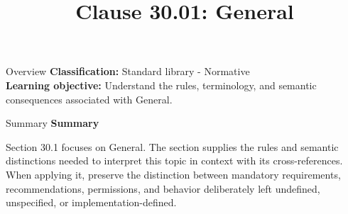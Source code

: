 \documentclass[10pt,letterpaper]{article}
\title{Clause 30.01: General}
\author{}
\date{}
\begin{document}
\maketitle
\begin{CornellOverviewBox}{Overview}
\textbf{Classification:} Standard library - Normative\\[2pt]
\textbf{Learning objective:} Understand the rules, terminology, and semantic consequences associated with General.
\end{CornellOverviewBox}\begin{CornellSummaryBox}{Summary}
{\sffamily\bfseries\color{Accent} Summary}\par\vspace{3pt}Section 30.1 focuses on General. The section supplies the rules and semantic distinctions needed to interpret this topic in context with its cross-references. When applying it, preserve the distinction between mandatory requirements, recommendations, permissions, and behavior deliberately left undefined, unspecified, or implementation-defined.
\end{CornellSummaryBox}
\end{document}
